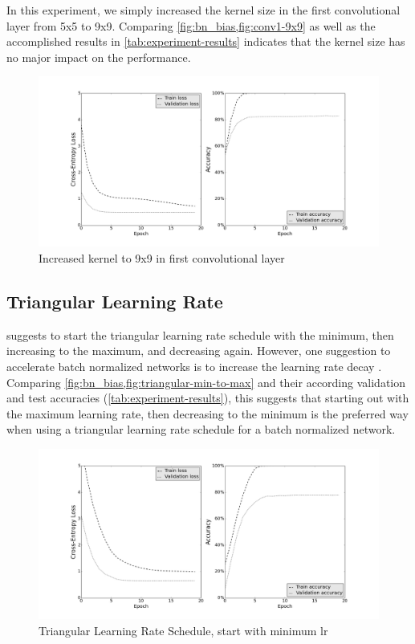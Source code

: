 \documentclass[a4paper, 11pt]{article}
\begin{document}
In this experiment, we simply increased the kernel size in the first convolutional layer from 5x5 to 9x9. Comparing \cref{fig:bn_bias,fig:conv1-9x9} as well as the accomplished results in \cref{tab:experiment-results} indicates that the kernel size has no major impact on the performance.
\begin{figure}[H]
	\includegraphics[width=\linewidth]{conv1-9x9.png}
	\caption{Increased kernel to 9x9 in first convolutional layer }
	\label{fig:conv1-9x9}
\end{figure}

\clearpage

\subsection{Triangular Learning Rate} \label{sec:lr}
\citet{Smith2015} suggests to start the triangular learning rate schedule with the minimum, then increasing to the maximum, and decreasing again.
However, one suggestion to accelerate batch normalized networks is to increase the learning rate decay \cite{Ioffe2015}.
Comparing \cref{fig:bn_bias,fig:triangular-min-to-max} and their according validation and test accuracies (\cref{tab:experiment-results}), this suggests that starting out with the maximum learning rate, then decreasing to the minimum is the preferred way when using a triangular learning rate schedule for a batch normalized network.

\begin{figure}[H]
	\includegraphics[width=\linewidth]{triangular-min-to-max.png}
	\caption{Triangular Learning Rate Schedule, start with minimum lr }
	\label{fig:triangular-min-to-max}
\end{figure}
\end{document}
